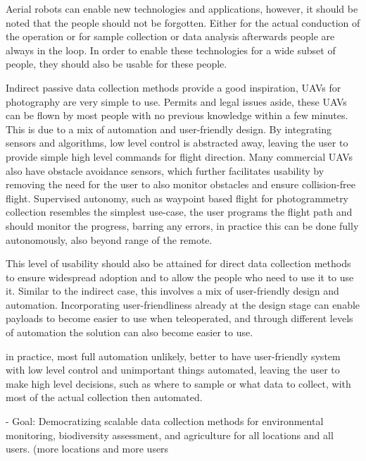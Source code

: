 Aerial robots can enable new technologies and applications, however, it should be noted that the people should not be forgotten. Either for the actual conduction of the operation or for sample collection or data analysis afterwards people are always in the loop. In order to enable these technologies for a wide subset of people, they should also be usable for these people. 

Indirect passive data collection methods provide a good inspiration, UAVs for photography are very simple to use. Permits and legal issues aside, these UAVs can be  flown by most people with no previous knowledge within a few minutes. This is due to a mix of automation and user-friendly design. By integrating sensors and algorithms, low level control is abstracted away, leaving the user to provide simple high level commands for flight direction. Many commercial UAVs also have obstacle avoidance sensors, which further facilitates usability by removing the need for the user to also monitor obstacles and ensure collision-free flight. Supervised autonomy, such as waypoint based flight for photogrammetry collection resembles the simplest use-case, the user programs the flight path and should monitor the progress, barring any errors, in practice this can be done fully autonomously, also beyond range of the remote.

This level of usability should also be attained for direct data collection methods to ensure widespread adoption and to allow the people who need to use it to use it. Similar to the indirect case, this involves a mix of user-friendly design and automation. Incorporating user-friendliness already at the design stage can enable payloads to become easier to use when teleoperated, and through different levels of automation the solution can also become easier to use. 

in practice, most full automation unlikely, better to have user-friendly system with low level control and unimportant things automated, leaving the user to make high level decisions, such as where to sample or what data to collect, with most of the actual collection then automated.


- Goal: Democratizing scalable data collection methods for environmental monitoring, biodiversity assessment, and agriculture for all locations and all users. (more locations and more users

